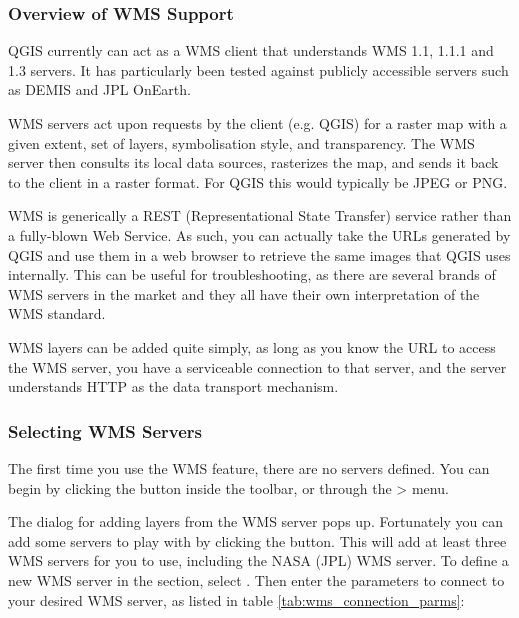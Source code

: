\subsubsection{Overview of WMS Support}\label{sec:ogc-wms-about}

QGIS currently can act as a WMS client that understands WMS 1.1, 1.1.1 and 1.3
servers.  It has particularly been tested against publicly accessible servers
such as DEMIS and JPL OnEarth.

WMS servers act upon requests by the client (e.g. QGIS) for a raster map with
a given extent, set of layers, symbolisation style, and transparency.  The WMS
server then consults its local data sources, rasterizes the map, and sends
it back to the client in a raster format.  For QGIS this would typically
be JPEG or PNG.

WMS is generically a REST (Representational State Transfer) service rather than
a fully-blown Web Service.  As such, you can actually take the URLs generated by
QGIS and use them in a web browser to retrieve the same images that QGIS uses
internally.  This can be useful for troubleshooting, as there are
several brands of WMS servers in the market and they all have their own
interpretation of the WMS standard.

WMS layers can be added quite simply, as long as you know the URL to access
the WMS server, you have a serviceable connection to that server, and the
server understands HTTP as the data transport mechanism.

\subsubsection{Selecting WMS Servers}\label{sec:ogc-wms-servers}

The first time you use the WMS feature, there are no servers defined. You 
can begin by clicking the  button inside the toolbar, 
or through the > menu.

The dialog  for adding layers from the WMS server pops up. Fortunately you can 
add some servers to play with by clicking the  
button. This will add at least three WMS servers for you to use, including the NASA (JPL) 
WMS server. To define a new WMS server in the  section, 
select . Then enter the parameters to connect to your desired
WMS server, as listed in table \ref{tab:wms_connection_parms}:

